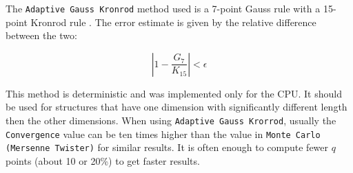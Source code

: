 \documentclass[../D+Manual.tex]{subfiles}
\begin{document}
The \texttt{Adaptive Gauss Kronrod} method used is a 7-point Gauss rule with a 15-point Kronrod rule \cite{kronrod1964integration,laurie1997calculation}. The error estimate is given by the relative difference between the two:

\begin{equation}
\left|1 - \frac{G_{7}}{K_{15}}\right| < \epsilon
\end{equation}

This method is deterministic and was implemented only for the CPU. It should be used for structures that have one dimension with significantly different length then the other dimensions. When using \texttt{Adaptive Gauss Krorrod}, usually the \texttt{Convergence} value can be ten times higher than the value in \texttt{Monte Carlo (Mersenne Twister)} for similar results. It is often enough to compute fewer $q$ points (about 10 or 20\%) to get faster results.     
\end{document}
